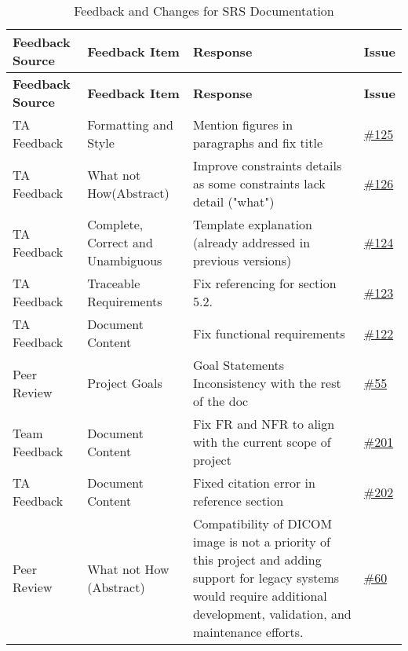 \documentclass{article}
\begin{document}
\begin{longtable}{| p{} | p{} | p{} | p{} |}
    \caption{Feedback and Changes for SRS Documentation } \\
    \hline
    \textbf{Feedback Source} & \textbf{Feedback Item} & \textbf{Response} & \textbf{Issue} \\
    \hline
    \endfirsthead
    \hline
    \textbf{Feedback Source} & \textbf{Feedback Item} & \textbf{Response} & \textbf{Issue} \\
    \hline
    \endhead
    \hline
    \endfoot
    TA Feedback & Formatting and Style & Mention figures in paragraphs and fix title & \href{https://github.com/RezaJodeiri/CXR-Capstone/issues/125}{\#125}\\
    \hline
    TA Feedback & What not How(Abstract) & Improve constraints details as some constraints lack detail ("what") & \href{https://github.com/RezaJodeiri/CXR-Capstone/issues/126}{\#126} \\
    \hline
    TA Feedback & Complete, Correct and Unambiguous & Template explanation (already addressed in previous versions) & \href{https://github.com/RezaJodeiri/CXR-Capstone/issues/124}{\#124}\\
    \hline
    TA Feedback & Traceable Requirements & Fix referencing for section 5.2. & \href{https://github.com/RezaJodeiri/CXR-Capstone/issues/123}{\#123} \\
    \hline
    TA Feedback & Document Content & Fix functional requirements & \href{https://github.com/RezaJodeiri/CXR-Capstone/issues/122}{\#122} \\
    \hline
    Peer Review & Project Goals & Goal Statements Inconsistency with the rest of the doc & \href{https://github.com/RezaJodeiri/CXR-Capstone/issues/55}{\#55} \\
    \hline
    Team Feedback & Document Content & Fix FR and NFR to align with the current scope of project & \href{https://github.com/RezaJodeiri/CXR-Capstone/issues/201}{\#201}\\
    \hline
    TA Feedback & Document Content & Fixed citation error in reference section  & \href{https://github.com/RezaJodeiri/CXR-Capstone/issues/202}{\#202}\\
    \hline
    Peer Review & What not How (Abstract) & Compatibility of DICOM image is not a priority of this project and adding support for legacy systems would require additional development, validation, and maintenance efforts. & \href{https://github.com/RezaJodeiri/CXR-Capstone/issues/60}{\#60}\\

\end{longtable}
\end{document}
